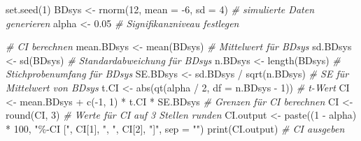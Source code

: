 \documentclass[
]{book}
\newenvironment{Shaded}{\begin{snugshade}}{\end{snugshade}}
\newcommand{\AttributeTok}[1]{\textcolor[rgb]{0.77,0.63,0.00}{#1}}
\newcommand{\CommentTok}[1]{\textcolor[rgb]{0.56,0.35,0.01}{\textit{#1}}}
\newcommand{\DecValTok}[1]{\textcolor[rgb]{0.00,0.00,0.81}{#1}}
\newcommand{\FloatTok}[1]{\textcolor[rgb]{0.00,0.00,0.81}{#1}}
\newcommand{\FunctionTok}[1]{\textcolor[rgb]{0.00,0.00,0.00}{#1}}
\newcommand{\NormalTok}[1]{#1}
\newcommand{\OtherTok}[1]{\textcolor[rgb]{0.56,0.35,0.01}{#1}}
\newcommand{\SpecialCharTok}[1]{\textcolor[rgb]{0.00,0.00,0.00}{#1}}
\newcommand{\StringTok}[1]{\textcolor[rgb]{0.31,0.60,0.02}{#1}}
\begin{document}
\begin{Shaded}
\begin{Highlighting}[]
\FunctionTok{set.seed}\NormalTok{(}\DecValTok{1}\NormalTok{)}
\NormalTok{BDsys }\OtherTok{\textless{}{-}} \FunctionTok{rnorm}\NormalTok{(}\DecValTok{12}\NormalTok{, }\AttributeTok{mean =} \SpecialCharTok{{-}}\DecValTok{6}\NormalTok{, }\AttributeTok{sd =} \DecValTok{4}\NormalTok{)  }\CommentTok{\# simulierte Daten generieren  }
\NormalTok{alpha }\OtherTok{\textless{}{-}} \FloatTok{0.05}                          \CommentTok{\# Signifikanzniveau festlegen}

\CommentTok{\# CI berechnen  }
\NormalTok{mean.BDsys }\OtherTok{\textless{}{-}} \FunctionTok{mean}\NormalTok{(BDsys)              }\CommentTok{\# Mittelwert für BDsys}
\NormalTok{sd.BDsys }\OtherTok{\textless{}{-}} \FunctionTok{sd}\NormalTok{(BDsys)                  }\CommentTok{\# Standardabweichung für BDsys}
\NormalTok{n.BDsys }\OtherTok{\textless{}{-}} \FunctionTok{length}\NormalTok{(BDsys)               }\CommentTok{\# Stichprobenumfang für BDsys}
\NormalTok{SE.BDsys }\OtherTok{\textless{}{-}}\NormalTok{ sd.BDsys }\SpecialCharTok{/} \FunctionTok{sqrt}\NormalTok{(n.BDsys)   }\CommentTok{\# SE für Mittelwert von BDsys    }
\NormalTok{t.CI }\OtherTok{\textless{}{-}} \FunctionTok{abs}\NormalTok{(}\FunctionTok{qt}\NormalTok{(alpha }\SpecialCharTok{/} \DecValTok{2}\NormalTok{, }\AttributeTok{df =}\NormalTok{ n.BDsys }\SpecialCharTok{{-}} \DecValTok{1}\NormalTok{))  }\CommentTok{\# t{-}Wert}
\NormalTok{CI }\OtherTok{\textless{}{-}}\NormalTok{ mean.BDsys }\SpecialCharTok{+} \FunctionTok{c}\NormalTok{(}\SpecialCharTok{{-}}\DecValTok{1}\NormalTok{, }\DecValTok{1}\NormalTok{) }\SpecialCharTok{*}\NormalTok{ t.CI }\SpecialCharTok{*}\NormalTok{ SE.BDsys  }\CommentTok{\#  Grenzen für CI berechnen}
\NormalTok{CI }\OtherTok{\textless{}{-}} \FunctionTok{round}\NormalTok{(CI, }\DecValTok{3}\NormalTok{)                     }\CommentTok{\# Werte für CI auf 3 Stellen runden}
\NormalTok{CI.output }\OtherTok{\textless{}{-}} \FunctionTok{paste}\NormalTok{((}\DecValTok{1} \SpecialCharTok{{-}}\NormalTok{ alpha) }\SpecialCharTok{*} \DecValTok{100}\NormalTok{, }\StringTok{"\%{-}CI ["}\NormalTok{, CI[}\DecValTok{1}\NormalTok{], }\StringTok{", "}\NormalTok{, CI[}\DecValTok{2}\NormalTok{], }\StringTok{"]"}\NormalTok{, }\AttributeTok{sep =} \StringTok{""}\NormalTok{)}
\FunctionTok{print}\NormalTok{(CI.output)                       }\CommentTok{\# CI ausgeben}
\end{Highlighting}
\end{Shaded}
\end{document}
